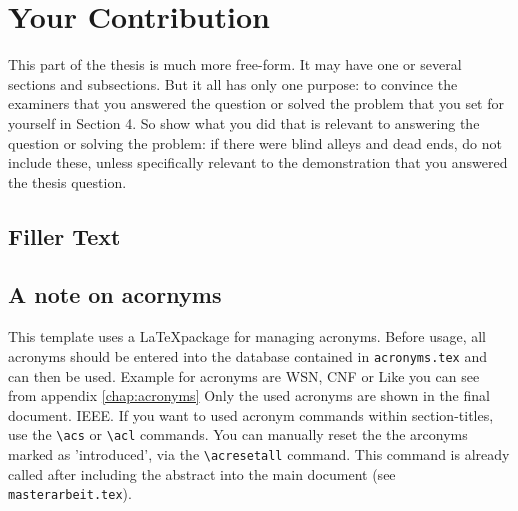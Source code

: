 \chapter{Your Contribution}
\label{chap:contribution1}
This part of the thesis is much more free-form. It may have one or
several sections and subsections. But it all has only one purpose: to convince
the examiners that you answered the question or solved the problem that you
set for yourself in Section 4. So show what you did that is relevant to
answering the question or solving the problem: if there were blind alleys and
dead ends, do not include these, unless specifically relevant to the
demonstration that you answered the thesis question. 

\section{Filler Text}
\Blindtext

\section{A note on acornyms}
This template uses a \LaTeX package for managing acronyms. Before usage, all
acronyms should be entered into the database contained in
\texttt{acronyms.tex} and can then be used. Example for acronyms are \ac{WSN},
\ac{CNF} or Like you can see from appendix \ref{chap:acronyms} Only the used
acronyms are shown in the final document.  \ac{IEEE}. If you want to used
acronym commands within section-titles, use the \verb|\acs| or \verb|\acl|
commands. You can manually reset the the arconyms marked as 'introduced', via
the \verb|\acresetall| command. This command is already called after including
the abstract into the main document (see \texttt{masterarbeit.tex}).



